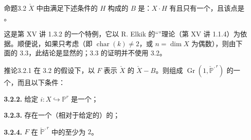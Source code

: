\begin{SGAresult}{命题}{3.2}
$\check X$ 中由满足下述条件的 $H$ 构成的 $B$ 是：$X\cdot H$ 有且只有一个，且该点是
。
\end{SGAresult}
这是第 XV 讲 1.3.2 的一个特例，它以 R. Elkik 的“”理论（第 XV 讲 1.1.4）为依据。顺便说，如果只考虑（即 $\operatorname{char}(k)\ne2$，或 $n=\dim X$ 为偶数），则由下面的 3.3，此结论是显然的；3.3 的证明并不使用 3.2。

\begin{SGAresult}{推论}{3.2.1}
在 3.2 的假设下，以 $F$ 表示 $\check X$ 的 $\check X-B$。则组成 $\operatorname{Gr}(1,\check{\mathbb P}^{,r})$ 的一个，而且以下条件：

\textbf{3.2.2.} 给定 $i:X\hookrightarrow\mathbb P^r$ 是一个；

\textbf{3.2.3.} 存在一个（相对于给定的）的；

\textbf{3.2.4.} $F$ 在 $\check{\mathbb P}^{,r}$ 中的至少为 $2$。
\end{SGAresult}
